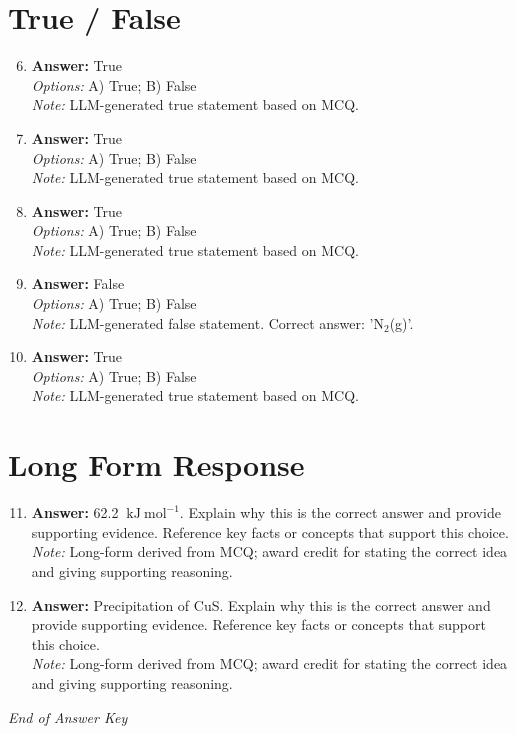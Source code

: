 \documentclass[12pt]{article}
\begin{document}
\section*{True / False}
\begin{enumerate}[label=\arabic*.]
\setcounter{enumi}{5}
\item \textbf{Answer:} True
\\ \textit{Options:} A) True; B) False
\\ \textit{Note:} LLM-generated true statement based on MCQ.
\item \textbf{Answer:} True
\\ \textit{Options:} A) True; B) False
\\ \textit{Note:} LLM-generated true statement based on MCQ.
\item \textbf{Answer:} True
\\ \textit{Options:} A) True; B) False
\\ \textit{Note:} LLM-generated true statement based on MCQ.
\item \textbf{Answer:} False
\\ \textit{Options:} A) True; B) False
\\ \textit{Note:} LLM-generated false statement. Correct answer: 'N$_{2}$(g)'.
\item \textbf{Answer:} True
\\ \textit{Options:} A) True; B) False
\\ \textit{Note:} LLM-generated true statement based on MCQ.
\end{enumerate}

\section*{Long Form Response}
\begin{enumerate}[label=\arabic*.]
\setcounter{enumi}{10}
\item \textbf{Answer:} 62.2 $\mathrm{~kJ} \mathrm{~mol}^{-1}$. Explain why this is the correct answer and provide supporting evidence. Reference key facts or concepts that support this choice.
\\ \textit{Note:} Long-form derived from MCQ; award credit for stating the correct idea and giving supporting reasoning.
\item \textbf{Answer:} Precipitation of CuS. Explain why this is the correct answer and provide supporting evidence. Reference key facts or concepts that support this choice.
\\ \textit{Note:} Long-form derived from MCQ; award credit for stating the correct idea and giving supporting reasoning.
\end{enumerate}

\vfill
\noindent\textit{End of Answer Key}
\end{document}

